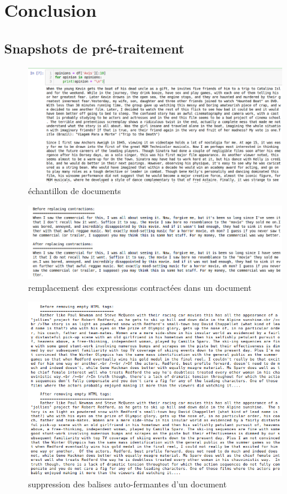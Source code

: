 \documentclass[12pt,a4paper]{report}
\theoremstyle{definition}
\begin{document}
\chapter{Conclusion}

\begin{appendices}
\chapter{Snapshots de pré-traitement}
\begin{figure}[!ht]
  \centering
  \includegraphics[scale=0.4]{images/snapshots/documents_sample.png}
  \caption{échantillon de documents}
  \label{fig:document_sample}
\end{figure}

\begin{figure}[!ht]
  \centering
  \includegraphics[scale=0.4]{images/snapshots/replace_contractions.png}
  \caption{remplacement des expressions contractées dans un document}
  \label{fig:replace_contractions}
\end{figure}

\begin{figure}[!ht]
  \centering
  \includegraphics[scale=0.6]{images/snapshots/remove_empty_html_tags.png}
  \caption{suppression des balises auto-fermantes d'un document}
  \label{fig:remove_empty_html_tags}
\end{figure}


\end{appendices}
\end{document}
